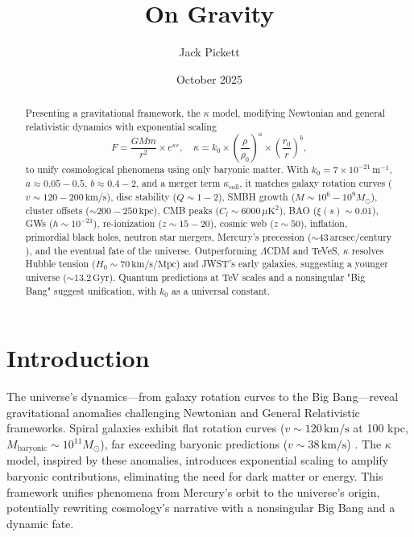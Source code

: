 \documentclass[a4paper,12pt]{article}
\title{On Gravity}
\author{Jack Pickett}
\date{October 2025}
\begin{document}
\maketitle

\begin{abstract}
Presenting a gravitational framework, the $\kappa$ model, modifying Newtonian and general relativistic dynamics with exponential scaling
\[
F = \frac{G M m}{r^2} \times e^{\kappa r}, \quad \kappa = k_0 \times \left( \frac{\rho}{\rho_0} \right)^a \times \left( \frac{r_0}{r} \right)^b,
\]
to unify cosmological phenomena using only baryonic matter. With $k_0 = 7 \times 10^{-21} \, \text{m}^{-1}$, $a \approx 0.05-0.5$, $b \approx 0.4-2$, and a merger term $\kappa_{\text{coll}}$, it matches galaxy rotation curves ($v \sim 120-200 \, \text{km/s}$), disc stability ($Q \sim 1-2$), SMBH growth ($M \sim 10^6-10^9 M_\odot$), cluster offsets ($\sim 200-250 \, \text{kpc}$), CMB peaks ($C_l \sim 6000 \, \mu\text{K}^2$), BAO ($\xi(s) \sim 0.01$), GWs ($h \sim 10^{-21}$), re-ionization ($z \sim 15-20$), cosmic web ($z \sim 50$), inflation, primordial black holes, neutron star mergers, Mercury’s precession ($\sim 43 \, \text{arcsec/century}$), and the eventual fate of the universe. Outperforming $\Lambda$CDM and TeVeS, $\kappa$ resolves Hubble tension ($H_0 \sim 70 \, \text{km/s/Mpc}$) and JWST’s early galaxies, suggesting a younger universe ($\sim 13.2 \, \text{Gyr}$). Quantum predictions at TeV scales and a nonsingular "Big Bang" suggest unification, with $k_0$ as a universal constant.
\end{abstract}

\section{Introduction}
The universe’s dynamics—from galaxy rotation curves to the Big Bang—reveal gravitational anomalies challenging Newtonian and General Relativistic frameworks. Spiral galaxies exhibit flat rotation curves ($v \sim 120 \, \text{km/s}$ at 100 kpc, $M_\text{baryonic} \sim 10^{11} M_\odot$), far exceeding baryonic predictions ($v \sim 38 \, \text{km/s}$) \citep{Rubin1970}. The $\kappa$ model, inspired by these anomalies, introduces exponential scaling to amplify baryonic contributions, eliminating the need for dark matter or energy. This framework unifies phenomena from Mercury’s orbit to the universe’s origin, potentially rewriting cosmology’s narrative with a nonsingular Big Bang and a dynamic fate.
\end{document}
